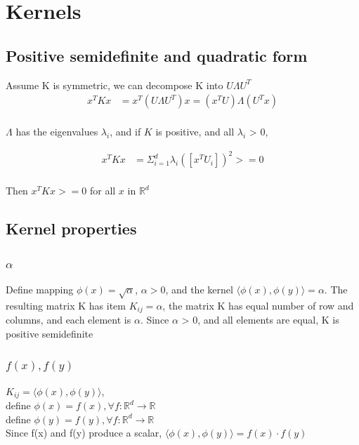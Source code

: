 \documentclass[letterpaper, 12]{article}
\begin{document}
\section{Kernels}
\subsection{Positive semidefinite and quadratic form}
Assume K is symmetric, we can decompose K into $U \Lambda U^T$
\begin{equation*}
\begin{split}
x^T K x &= x^T (U \Lambda U^T) x = (x^T U) \Lambda (U^T x)\\
\end{split}
\end{equation*}

$\Lambda$ has the eigenvalues $\lambda_{i}$, and if $K$ is positive, and all $\lambda_{i}$ > 0,

\begin{equation*}
\begin{split}
x^T K x &= \Sigma_{i =1}^{d} \lambda_{i} ([x^T U_{i}])^2 >= 0\\
\end{split}
\end{equation*}

Then $x^T K x >= 0$ for all $x$ in $ \mathbb{R}^{d}$

\subsection{Kernel properties}
\subsubsection{$\alpha$}
Define mapping $\phi (x) = \sqrt{\alpha}$, $\alpha > 0$, and the kernel $\langle \phi(x), \phi(y) \rangle = \alpha$.
The resulting matrix K has item $K_{ij} = \alpha $, the matrix K has equal number of row and columns, and each element is $\alpha$. Since $\alpha$ > 0, and all elements are equal, K is positive semidefinite
 
\subsubsection{$f(x), f(y)$}
$K_{ij} = \langle \phi (x),  \phi (y) \rangle$, \\
define $\phi(x) = f(x), \forall f: \mathbb{R}^{d} \rightarrow \mathbb{R}$\\
define $\phi(y) = f(y), \forall f: \mathbb{R}^{d} \rightarrow \mathbb{R}$\\
Since f(x) and f(y) produce a scalar,  $\langle \phi (x),  \phi (y) \rangle = f(x) \cdot f(y)$
\end{document}

